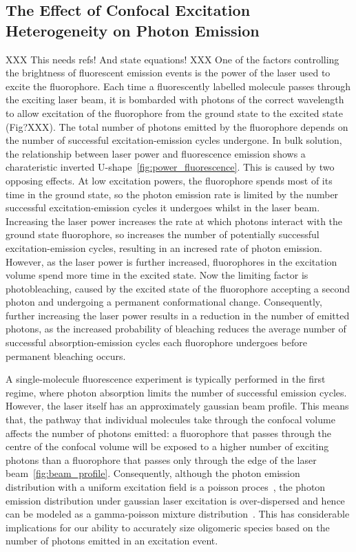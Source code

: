 \subsection{The Effect of Confocal Excitation Heterogeneity on Photon Emission}
XXX This needs refs! And state equations! XXX
One of the factors controlling the brightness of fluorescent emission events is the power of the laser used to excite the fluorophore. Each time a fluorescently labelled molecule passes through the exciting laser beam, it is bombarded with photons of the correct wavelength to allow excitation of the fluorophore from the ground state to the excited state (Fig?XXX). The total number of photons emitted by the fluorophore depends on the number of successful excitation-emission cycles undergone. In bulk solution, the relationship between laser power and fluorescence emission shows a charateristic inverted U-shape~\ref{fig:power_fluorescence}. This is caused by two opposing effects. At low excitation powers, the fluorophore spends most of its time in the ground state, so the photon emission rate is limited by the number successful excitation-emission cycles it undergoes whilst in the laser beam. Increasing the laser power increases the rate at which photons interact with the ground state fluorophore, so increases the number of potentially successful excitation-emission cycles, resulting in an incresed rate of photon emission. However, as the laser power is further increased, fluorophores in the excitation volume spend more time in the excited state. Now the limiting factor is photobleaching, caused by the excited state of the fluorophore accepting a second photon and undergoing a permanent conformational change. Consequently, further increasing the laser power results in a reduction in the number of emitted photons, as the increased probability of bleaching reduces the average number of successful absorption-emission cycles each fluorophore undergoes before permanent bleaching occurs. 

A single-molecule fluorescence experiment is typically performed in the first regime, where photon absorption limits the number of successful emission cycles. However, the laser itself has an approximately gaussian beam profile. This means that, the pathway that individual molecules take through the confocal volume affects the number of photons emitted: a fluorophore that passes through the centre of the confocal volume will be exposed to a higher number of exciting photons than a fluorophore that passes only through the edge of the laser beam~\ref{fig:beam_profile}. Consequently, although the photon emission distribution with a uniform excitation field is a poisson proces~\cite{???}, the photon emission distribution under gaussian laser excitation is over-dispersed and hence can be modeled as a gamma-poisson mixture distribution~\cite{chen1999}. This has considerable implications for our ability to accurately size oligomeric species based on the number of photons emitted in an excitation event.

